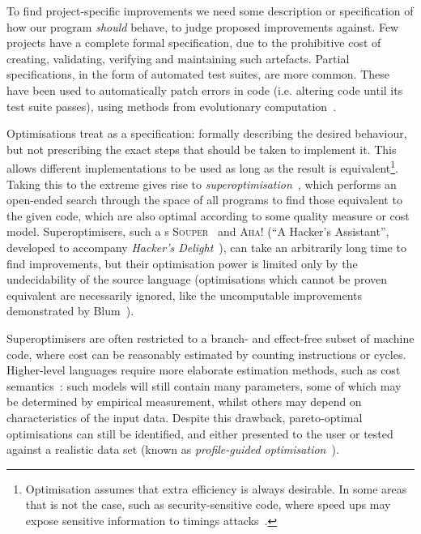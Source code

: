 To find project-specific improvements we need some description or specification
of how our program \emph{should} behave, to judge proposed improvements against.
Few projects have a complete formal specification, due to the prohibitive cost
of creating, validating, verifying and maintaining such artefacts. Partial
specifications, in the form of automated test suites, are more common. These
have been used to automatically patch errors in code (i.e. altering code until
its test suite passes), using methods from evolutionary
computation~\cite{Forrest.Nguyen.Weimer.ea:2009,weimer2009automatically,Schulte.Forrest.Weimer:2010}.

Optimisations treat  as a specification: formally
describing the desired behaviour, but not prescribing the exact steps that
should be taken to implement it. This allows different implementations to be
used as long as the result is equivalent\footnote{Optimisation assumes that
  extra efficiency is always desirable. In some areas that is not the case, such
  as security-sensitive code, where speed ups may expose sensitive information
  to timings attacks~\cite{kocher1996timing}.}. Taking this to the extreme gives
rise to \emph{superoptimisation}~\cite{massalin1987superoptimizer}, which
performs an open-ended search through the space of all programs to find those
equivalent to the given code, which are also optimal according to some quality
measure or cost model. Superoptimisers, such a
s \textsc{Souper}~\cite{sasnauskas2017souper} and \textsc{Aha!} (``A Hacker's
Assistant'', developed to accompany \emph{Hacker's
  Delight}~\cite{warren2013hacker}), can take an arbitrarily long time to find
improvements, but their optimisation power is limited only by the undecidability
of the source language (optimisations which cannot be proven equivalent are
necessarily ignored, like the uncomputable improvements demonstrated by
Blum~\cite{blum1967machine}).

Superoptimisers are often restricted to a branch- and effect-free subset of
machine code, where cost can be reasonably estimated by counting instructions or
cycles. Higher-level languages require more elaborate estimation methods, such
as cost semantics~\cite{danner2015denotational}: such models will still contain
many parameters, some of which may be determined by empirical measurement,
whilst others may depend on characteristics of the input data. Despite this
drawback, pareto-optimal optimisations can still be identified, and either
presented to the user or tested against a realistic data set (known as
\emph{profile-guided optimisation}~\cite{TODO}).

